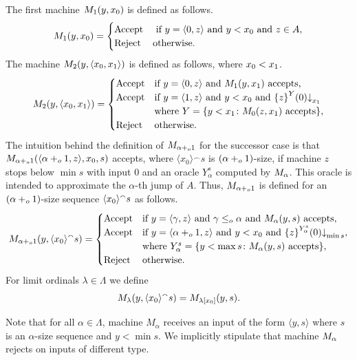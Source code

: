 \documentclass[11pt]{amsart}
\theoremstyle{definition}
\theoremstyle{remark}
\theoremstyle{plain}
\def\la{\langle}
\def\ra{\rangle}
\def\conc{{}^\smallfrown}
\newcommand{\set}[1]{{\{{#1}\}}}
\def\stops{{\downarrow}}
\newcommand{\leqo}{\leq\sb{o}}
\newcommand{\pluso}{+\sb{o}}
\def\stops{{\downarrow}}
\begin{document}
The first machine $M\sb1(y,x\sb0)$ is defined as follows.
$$
M\sb1(y,x\sb0)=
\begin{cases}
\mbox{Accept} & \mbox{ if } y=\langle 0,z\rangle \mbox{ and } y<x\sb0 \mbox{ and } z\in A,\\
\mbox{Reject} &\mbox{otherwise.}
\end{cases}
$$
The machine $M\sb2(y,\langle x\sb0,x\sb1\rangle)$ is defined as follows, where $x\sb0 < x\sb1$.
$$
M\sb2(y,\langle x\sb0,x\sb1\rangle)=
\begin{cases}
\mbox{Accept} &\mbox{if }y=\langle 0,z \rangle \mbox{ and } %
                                M\sb1(y,x\sb1)\mbox{ accepts,}\\
\mbox{Accept} &\mbox{if } y=\la1,z\ra\mbox{ and }y<x\sb0 \mbox{ and }\set{z}\sp Y(0)\stops\sb{x\sb1} \\
               &\mbox{where } Y=\{y<x\sb 1\colon M\sb0(z,x\sb1)\mbox{ accepts}\},\\
\mbox{Reject} &\mbox{otherwise.}
\end{cases}
$$
The intuition behind the definition of $M\sb{\alpha\pluso1}$ for the successor case is that $M\sb{\alpha\pluso1} (\langle\alpha\pluso1, z\rangle,x\sb0, s)$ accepts, where $\langle x_0\rangle \conc s$ is $(\alpha\pluso1)$-size, if machine $z$ stops below $\min s$ with input $0$ and an oracle $Y_\alpha^s$ computed by $M\sb\alpha$. 
This oracle is intended to approximate the $\alpha$-th jump of $A$. 
Thus, $M\sb{\alpha\pluso1}$ is defined for an $(\alpha\pluso1)$-size sequence $\langle x\sb0\rangle \conc s$  as follows.
$$
M\sb{\alpha\pluso1}(y,\langle x\sb0\rangle \conc s)=
\begin{cases}
\mbox{Accept} &\mbox{if }y=\langle\gamma,z\rangle\mbox{ and } \gamma\leqo \alpha \mbox{ and }
              M\sb\alpha(y,s)\mbox{ accepts,}\\
\mbox{Accept} &\mbox{if }y=\langle\alpha\pluso1,z\rangle\mbox{ and } y<x\sb0 \mbox{ and }
                                    \set{z}\sp {Y^s_\alpha} (0)\stops\sb{\min s},\\
               &\mbox{where } Y^s_\alpha =\{ y<\max s\colon M\sb\alpha(y,s)\mbox{ accepts}\},\\
\mbox{Reject} &\mbox{otherwise.}
\end{cases}
$$
For limit ordinals $\lambda \in \Lambda$ we define
$$
M_\lambda(y,\langle x\sb0\rangle \conc s)=M_{\lambda[x\sb0]}(y,s).
$$

Note that for all $\alpha\in\Lambda$, machine $M_\alpha$ receives an input of the form $\langle y, s\rangle$ where  $s$ is an $\alpha$-size sequence and $y< \min s$.
We implicitly stipulate that machine $M\sb\alpha$ rejects on inputs of different type. 
\end{document}
